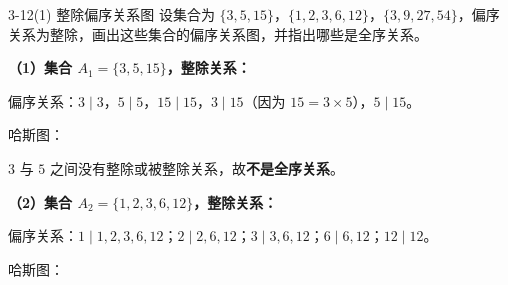 \documentclass[11pt]{article}
\begin{document}
\maketitle
\thispagestyle{empty}
\newpage


\begin{question}{3-12(1) 整除偏序关系图}
  设集合为 $\{3,5,15\}$，$\{1,2,3,6,12\}$，$\{3,9,27,54\}$，偏序关系为整除，画出这些集合的偏序关系图，并指出哪些是全序关系。

  \begin{answer}
    \vspace{1em}
    \noindent\textbf{（1）集合 $A_1 = \{3,5,15\}$，整除关系：}

    偏序关系：$3 \mid 3$，$5 \mid 5$，$15 \mid 15$，$3 \mid 15$（因为 $15 = 3 \times 5$），$5 \mid 15$。

    哈斯图：
    \begin{center}
    \end{center}

    $3$ 与 $5$ 之间没有整除或被整除关系，故\textbf{不是全序关系}。

    \vspace{1em}
    \noindent\textbf{（2）集合 $A_2 = \{1,2,3,6,12\}$，整除关系：}

    偏序关系：$1 \mid 1,2,3,6,12$；$2 \mid 2,6,12$；$3 \mid 3,6,12$；$6 \mid 6,12$；$12 \mid 12$。

    哈斯图：
    \begin{center}
    \end{center}


\end{answer}
\end{question}
\end{document}
